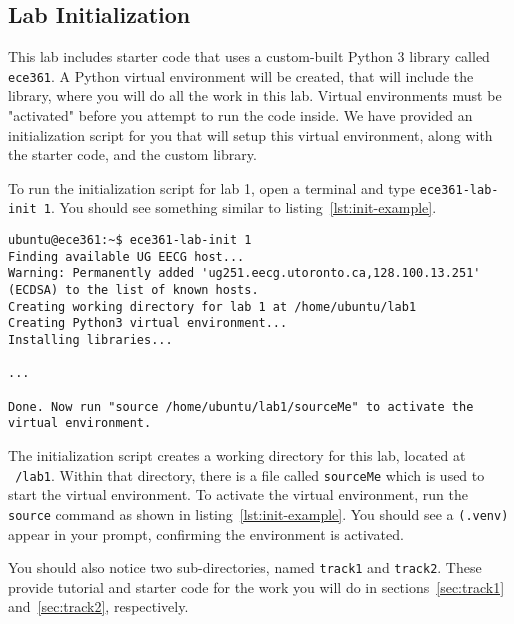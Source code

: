 \documentclass[11pt]{article}
\def\thelab{1}
\begin{document}
\subsection{Lab Initialization}
\label{subsec:lab-init}
This lab includes starter code that uses a custom-built Python 3 library called \texttt{ece361}. A Python virtual environment will be created, that will include the library, where you will do all the work in this lab. Virtual environments must be "activated" before you attempt to run the code inside. We have provided an initialization script for you that will setup this virtual environment, along with the starter code, and the custom library.


To run the initialization script for lab \thelab, open a terminal and type \texttt{ece361-lab-init \thelab}. You should see something similar to listing~\ref{lst:init-example}.
\begin{lstlisting}[style=ece361shell, caption={Initializing lab \thelab}, label={lst:init-example}]
ubuntu@ece361:~$ ece361-lab-init 1
Finding available UG EECG host...
Warning: Permanently added 'ug251.eecg.utoronto.ca,128.100.13.251' (ECDSA) to the list of known hosts.
Creating working directory for lab 1 at /home/ubuntu/lab1
Creating Python3 virtual environment...
Installing libraries...

...

Done. Now run "source /home/ubuntu/lab1/sourceMe" to activate the virtual environment.
\end{lstlisting}

The initialization script creates a working directory for this lab, located at \texttt{~/lab1}. Within that directory, there is a file called \texttt{sourceMe} which is used to start the virtual environment. To activate the virtual environment, run the \texttt{source} command as shown in listing~\ref{lst:init-example}. You should see a \texttt{(.venv)} appear in your prompt, confirming the environment is activated.

You should also notice two sub-directories, named \texttt{track1} and \texttt{track2}. These provide tutorial and starter code for the work you will do in sections~\ref{sec:track1} and~\ref{sec:track2}, respectively.
\end{document}
